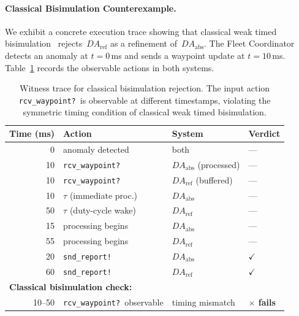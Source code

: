 
\paragraph{Classical Bisimulation Counterexample.}
We exhibit a concrete execution trace showing that classical weak
timed bisimulation~\cite{} rejects~$\mathit{DA}_{\mathrm{ref}}$ as a
refinement of~$\mathit{DA}_{\mathrm{abs}}$.  The Fleet Coordinator
detects an anomaly at $t=0$\,ms and sends a waypoint update at
$t=10$\,ms.  Table~\ref{tab:counterexample} records the observable
actions in both systems.

\begin{table}[t]
\centering
\caption{Witness trace for classical bisimulation rejection.  The
  input action \texttt{rcv\_waypoint?}\ is observable at different
  timestamps, violating the symmetric timing condition of classical
  weak timed bisimulation.}
\label{tab:counterexample}
\small
\begin{tabular}{r l l l}
\toprule
\textbf{Time (ms)} & \textbf{Action} & \textbf{System} & \textbf{Verdict} \\
\midrule
 0   & anomaly detected         & both                     & --- \\
10   & \texttt{rcv\_waypoint?}  & $\mathit{DA}_{\mathrm{abs}}$ (processed) & --- \\
10   & \texttt{rcv\_waypoint?}  & $\mathit{DA}_{\mathrm{ref}}$ (buffered)  & --- \\
10   & $\tau$ (immediate proc.) & $\mathit{DA}_{\mathrm{abs}}$             & --- \\
50   & $\tau$ (duty-cycle wake) & $\mathit{DA}_{\mathrm{ref}}$             & --- \\
15   & processing begins        & $\mathit{DA}_{\mathrm{abs}}$             & --- \\
55   & processing begins        & $\mathit{DA}_{\mathrm{ref}}$             & --- \\
20   & \texttt{snd\_report!}    & $\mathit{DA}_{\mathrm{abs}}$             & $\checkmark$ \\
60   & \texttt{snd\_report!}    & $\mathit{DA}_{\mathrm{ref}}$             & $\checkmark$ \\
\midrule
\multicolumn{4}{l}{\textbf{Classical bisimulation check:}} \\
\midrule
10--50 & \texttt{rcv\_waypoint?}\ observable & timing mismatch & \textbf{$\times$ fails} \\
\bottomrule
\end{tabular}


\end{table}
